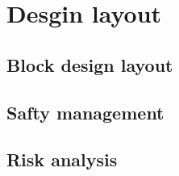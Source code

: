 \chapter{Desgin layout}
\label{cha:dela}

\section{Block design layout}
\label{sec:bldela}

\section{Safty management}
\label{sec:sama}

\section{Risk analysis}
\label{sec:rian}

